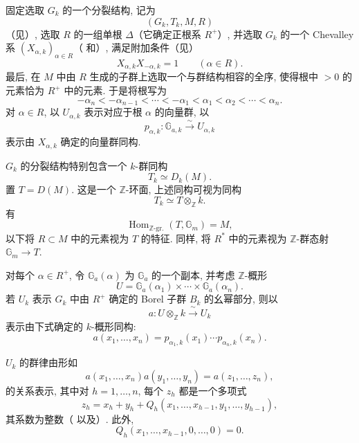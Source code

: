 固定选取 \(G_k\) 的一个分裂结构, 记为
\[
  (G_k,T_k,M,R)
\]
（见）, 选取 \(R\) 的一组单根 \(\Delta\)（它确定正根系 \(R^+\)）, 并选取 \(G_k\) 的一个 Chevalley 系 \((X_{\alpha,k})_{\alpha\in R}\)（ 和）, 满足附加条件（见）
\[
  X_{\alpha,k}X_{-\alpha,k}=1\qquad(\alpha\in R).
\]
最后, 在 \(M\) 中由 \(R\) 生成的子群上选取一个与群结构相容的全序, 使得根中 \(>0\) 的元素恰为 \(R^+\) 中的元素. 于是将根写为
\[
 -\alpha_n<-\alpha_{n-1}<\cdots<-\alpha_1
 <\alpha_1<\alpha_2<\cdots<\alpha_n.
\]
对 \(\alpha\in R\), 以 \(U_{\alpha,k}\) 表示对应于根 \(\alpha\) 的向量群, 以
\[
 p_{\alpha,k}\colon\mathbb G_{a,k}\xrightarrow{\ \sim\ }U_{\alpha,k}
\]
表示由 \(X_{\alpha,k}\) 确定的向量群同构.


\(G_k\) 的分裂结构特别包含一个 \(k\)-群同构
\[
 T_k\simeq D_k(M).
\]
置 \(T=D(M)\). 这是一个 \(\mathbb Z\)-环面, 上述同构可视为同构
\[
 T_k\simeq T\otimes_{\mathbb Z}k.
\]
有
\[
 \operatorname{Hom}_{\mathbb Z\text{-gr.}}(T,\mathbb G_m)=M,
\]
以下将 \(R\subset M\) 中的元素视为 \(T\) 的特征. 同样, 将 \(R^\ast\) 中的元素视为 \(\mathbb Z\)-群态射 \(\mathbb G_m\to T\).


对每个 \(\alpha\in R^+\), 令 \(\mathbb G_a(\alpha)\) 为 \(\mathbb G_a\) 的一个副本, 并考虑 \(\mathbb Z\)-概形
\[
 U=\mathbb G_a(\alpha_1)\times\cdots\times\mathbb G_a(\alpha_n).
\]
若 \(U_k\) 表示 \(G_k\) 中由 \(R^+\) 确定的 Borel 子群 \(B_k\) 的幺幂部分, 则以
\[
 a\colon U\otimes_{\mathbb Z}k\xrightarrow{\ \sim\ }U_k
\]
表示由下式确定的 \(k\)-概形同构:
\[
 a(x_1,\ldots,x_n)
 =p_{\alpha_1,k}(x_1)\cdots p_{\alpha_n,k}(x_n).
\]


\(U_k\) 的群律由形如
\[
 a(x_1,\ldots,x_n)a(y_1,\ldots,y_n)=a(z_1,\ldots,z_n),
\]
的关系表示, 其中对 \(h=1,\ldots,n\), 每个 \(z_h\) 都是一个多项式
\[
 z_h=x_h+y_h+
 Q_h(x_1,\ldots,x_{h-1},y_1,\ldots,y_{h-1}),
\]
其系数为整数（ 以及）. 此外,
\[
 Q_h(x_1,\ldots,x_{h-1},0,\ldots,0)=0.
\]

